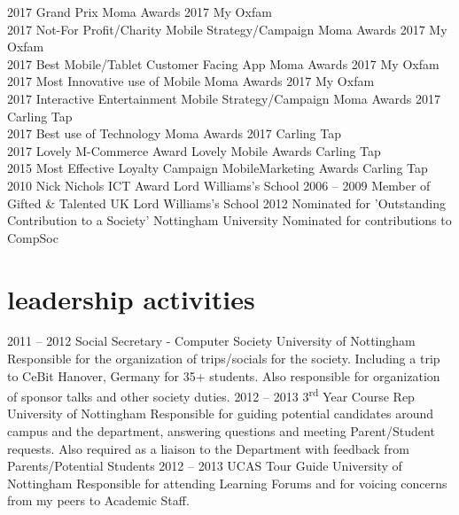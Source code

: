 \documentclass[]{friggeri-cv} %
\begin{document}
\begin{entrylist}
\entry
{2017}
{Grand Prix}
{Moma Awards 2017}
{My Oxfam \\}
\entry
{2017}
{Not-For Profit/Charity Mobile Strategy/Campaign}
{Moma Awards 2017}
{My Oxfam \\}
\entry
{2017}
{Best Mobile/Tablet Customer Facing App}
{Moma Awards 2017}
{My Oxfam \\}
\entry
{2017}
{Most Innovative use of Mobile}
{Moma Awards 2017}
{My Oxfam \\}
\entry
{2017}
{Interactive Entertainment Mobile Strategy/Campaign}
{Moma Awards 2017}
{Carling Tap \\}
\entry
{2017}
{Best use of Technology}
{Moma Awards 2017}
{Carling Tap \\}
\entry
{2017}
{Lovely M-Commerce Award}
{Lovely Mobile Awards}
{Carling Tap \\}
\entry
{2015}
{Most Effective Loyalty Campaign}
{MobileMarketing Awards}
{Carling Tap \\}
\entry
{2010}
{Nick Nichols ICT Award}
{Lord Williams's School}
{}
\entry
{2006 -- 2009}
{Member of Gifted \& Talented UK}
{Lord Williams's School}
{}
\entry
{2012}
{Nominated for 'Outstanding Contribution to a Society'}
{Nottingham University}
{Nominated for contributions to CompSoc}
\end{entrylist}


\section{leadership activities}

\begin{entrylist}
\entry
{2011 -- 2012}
{Social Secretary - Computer Society}
{University of Nottingham}
{Responsible for the organization of trips/socials for the society.
Including a trip to CeBit Hanover, Germany for 35+ students. Also responsible for organization of sponsor talks and other society duties.}
\entry
{2012 -- 2013}
{3\textsuperscript{rd} Year Course Rep}
{University of Nottingham}
{Responsible for guiding potential candidates around campus and the department, answering questions and meeting Parent/Student requests. Also required as a liaison to the Department with feedback from Parents/Potential Students}
\entry
{2012 -- 2013}
{UCAS Tour Guide}
{University of Nottingham}
{Responsible for attending Learning Forums and for voicing concerns from my peers to Academic Staff.}
\end{entrylist}
\end{document}
